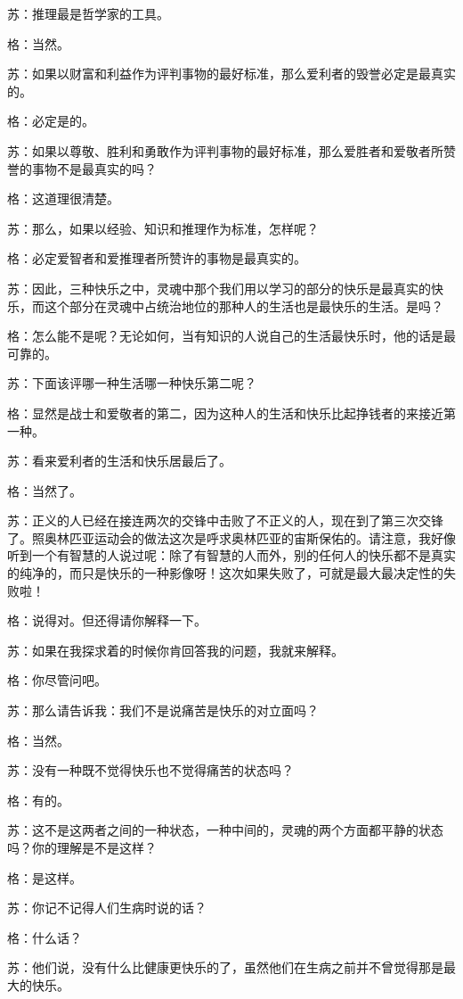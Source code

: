 \documentclass[12pt,oneside]{book}
\begin{document}
苏：推理最是哲学家的工具。

格：当然。

苏：如果以财富和利益作为评判事物的最好标准，那么爱利者的毁誉必定是最真实的。

格：必定是的。

苏：如果以尊敬、胜利和勇敢作为评判事物的最好标准，那么爱胜者和爱敬者所赞誉的事物不是最真实的吗？

格：这道理很清楚。

苏：那么，如果以经验、知识和推理作为标准，怎样呢？

格：必定爱智者和爱推理者所赞许的事物是最真实的。

苏：因此，三种快乐之中，灵魂中那个我们用以学习的部分的快乐是最真实的快乐，而这个部分在灵魂中占统治地位的那种人的生活也是最快乐的生活。是吗？

格：怎么能不是呢？无论如何，当有知识的人说自己的生活最快乐时，他的话是最可靠的。

苏：下面该评哪一种生活哪一种快乐第二呢？

格：显然是战士和爱敬者的第二，因为这种人的生活和快乐比起挣钱者的来接近第一种。

苏：看来爱利者的生活和快乐居最后了。

格：当然了。

苏：正义的人已经在接连两次的交锋中击败了不正义的人，现在到了第三次交锋了。照奥林匹亚运动会的做法这次是呼求奥林匹亚的宙斯保佑的。请注意，我好像听到一个有智慧的人说过呢：除了有智慧的人而外，别的任何人的快乐都不是真实的纯净的，而只是快乐的一种影像呀！这次如果失败了，可就是最大最决定性的失败啦！

格：说得对。但还得请你解释一下。

苏：如果在我探求着的时候你肯回答我的问题，我就来解释。

格：你尽管问吧。

苏：那么请告诉我：我们不是说痛苦是快乐的对立面吗？

格：当然。

苏：没有一种既不觉得快乐也不觉得痛苦的状态吗？

格：有的。

苏：这不是这两者之间的一种状态，一种中间的，灵魂的两个方面都平静的状态吗？你的理解是不是这样？

格：是这样。

苏：你记不记得人们生病时说的话？

格：什么话？

苏：他们说，没有什么比健康更快乐的了，虽然他们在生病之前并不曾觉得那是最大的快乐。
\end{document}
